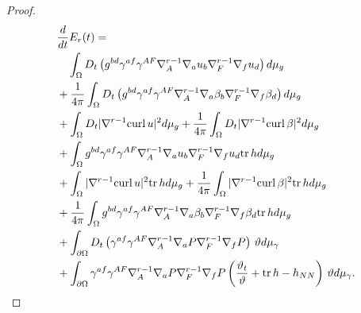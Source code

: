 \documentclass[12pt,reqno]{amsart}
\numberwithin{equation}{section}
\theoremstyle{definition}
\theoremstyle{remark}
\begin{document}
\begin{proof}
  \begin{align}
    &\frac{d}{dt}E_r(t)={\nonumber}\\
    &\quad\int_\Omega D_t\left(g^{bd}\gamma^{af}\gamma^{AF}{\nabla}_A^{r-1}{\nabla}_a u_b{\nabla}_F^{r-1}{\nabla}_f u_d\right) d\mu_g\label{eq.r.e1}\\
  &+\frac{1}{4\pi}\int_\Omega D_t\left(g^{bd}\gamma^{af}\gamma^{AF}{\nabla}_A^{r-1}{\nabla}_a \beta_b{\nabla}_F^{r-1}{\nabla}_f \beta_d\right) d\mu_g\label{eq.r.e2}\\
    &+\int_\Omega D_t|{\nabla}^{r-1}{\mathrm{curl}\,} u|^2 d\mu_g
+\frac{1}{4\pi}\int_\Omega D_t|{\nabla}^{r-1}{\mathrm{curl}\,} \beta|^2 d\mu_g\label{eq.r.e3}\\
    &+\int_\Omega g^{bd}\gamma^{af}\gamma^{AF}{\nabla}_A^{r-1}{\nabla}_a u_b{\nabla}_F^{r-1}{\nabla}_f u_d {\mathrm{tr}\,} h d\mu_g\label{eq.r.e4}\\
    &+\int_\Omega |{\nabla}^{r-1}{\mathrm{curl}\,} u|^2 {\mathrm{tr}\,} hd\mu_g
  +\frac{1}{4\pi}\int_\Omega |{\nabla}^{r-1}{\mathrm{curl}\,} \beta|^2 {\mathrm{tr}\,} hd\mu_g\label{eq.r.e5}\\
&+\frac{1}{4\pi}\int_\Omega g^{bd}\gamma^{af}\gamma^{AF}{\nabla}_A^{r-1}{\nabla}_a \beta_b{\nabla}_F^{r-1}{\nabla}_f \beta_d {\mathrm{tr}\,} h d\mu_g\label{eq.r.e6}\\
&+\int_{{\partial}\Omega} D_t\left(\gamma^{af}\gamma^{AF}{\nabla}_A^{r-1}{\nabla}_a {P }{\nabla}_F^{r-1}{\nabla}_f {P }\right)\, \vartheta d\mu_\gamma\label{eq.r.e7}\\
   &+\int_{{\partial}\Omega} \gamma^{af}\gamma^{AF}{\nabla}_A^{r-1}{\nabla}_a {P }{\nabla}_F^{r-1}{\nabla}_f {P }\left(\frac{\vartheta_t}{\vartheta}+{\mathrm{tr}\,} h-h_{NN}\right)\, \vartheta d\mu_\gamma.\label{eq.r.e8}
  \end{align}


\end{proof}
\end{document}
